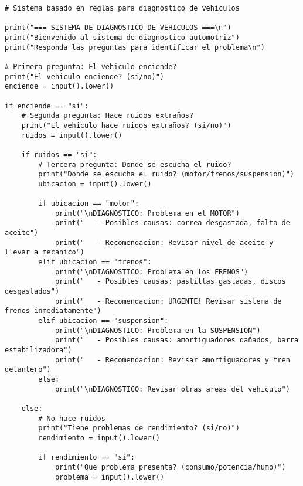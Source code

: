 \documentclass[12pt]{article}
\begin{document}
\begin{lstlisting}[caption={Sistema de Diagnóstico de Vehículos}]
# Sistema basado en reglas para diagnostico de vehiculos

print("=== SISTEMA DE DIAGNOSTICO DE VEHICULOS ===\n")
print("Bienvenido al sistema de diagnostico automotriz")
print("Responda las preguntas para identificar el problema\n")

# Primera pregunta: El vehiculo enciende?
print("El vehiculo enciende? (si/no)")
enciende = input().lower()

if enciende == "si":
    # Segunda pregunta: Hace ruidos extraños?
    print("El vehiculo hace ruidos extraños? (si/no)")
    ruidos = input().lower()
    
    if ruidos == "si":
        # Tercera pregunta: Donde se escucha el ruido?
        print("Donde se escucha el ruido? (motor/frenos/suspension)")
        ubicacion = input().lower()
        
        if ubicacion == "motor":
            print("\nDIAGNOSTICO: Problema en el MOTOR")
            print("   - Posibles causas: correa desgastada, falta de aceite")
            print("   - Recomendacion: Revisar nivel de aceite y llevar a mecanico")
        elif ubicacion == "frenos":
            print("\nDIAGNOSTICO: Problema en los FRENOS")
            print("   - Posibles causas: pastillas gastadas, discos desgastados")
            print("   - Recomendacion: URGENTE! Revisar sistema de frenos inmediatamente")
        elif ubicacion == "suspension":
            print("\nDIAGNOSTICO: Problema en la SUSPENSION")
            print("   - Posibles causas: amortiguadores dañados, barra estabilizadora")
            print("   - Recomendacion: Revisar amortiguadores y tren delantero")
        else:
            print("\nDIAGNOSTICO: Revisar otras areas del vehiculo")
    
    else:
        # No hace ruidos
        print("Tiene problemas de rendimiento? (si/no)")
        rendimiento = input().lower()
        
        if rendimiento == "si":
            print("Que problema presenta? (consumo/potencia/humo)")
            problema = input().lower()
            

\end{lstlisting}
\end{document}
